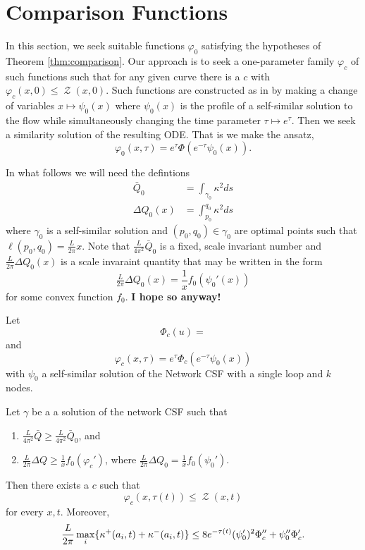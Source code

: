 \documentclass[11pt]{amsart}
\DeclareMathOperator{\chordarcprofile}{\mathcal{Z}}
\begin{document}
\section{Comparison Functions}
\label{sec:orgheadline11}

In this section, we seek suitable functions $\varphi_0$ satisfying the hypotheses of Theorem \ref{thm:comparison}. Our approach is to seek a one-parameter family $\varphi_c$ of such functions such that for any given curve there is a $c$ with $\varphi_c(x, 0) \leq \chordarcprofile(x, 0)$. Such functions are constructed as in \cite{MR2794630} by making a change of variables $x \mapsto \psi_0(x)$ where $\psi_0(x)$ is the profile of a self-similar solution to the flow while simultaneously changing the time parameter $\tau \mapsto e^{\tau}$. Then we seek a similarity solution of the resulting ODE. That is we make the ansatz,
\[
\varphi_0(x, \tau) = e^{\tau} \Phi(e^{-\tau} \psi_0(x)).
\]

In what follows we will need the defintions
\begin{align*}
\bar{Q}_0 &= \int_{\gamma_0} \kappa^2 ds \\
\Delta Q_0 (x) &= \int_{p_0}^{q_0} \kappa^2 ds
\end{align*}
where $\gamma_0$ is a self-similar solution and $(p_0, q_0) \in \gamma_0$ are optimal points such that $\ell(p_0, q_0) = \frac{L}{2\pi} x$. Note that $\tfrac{L}{4\pi^2} \bar{Q}_0$ is a fixed, scale invariant number and $\tfrac{L}{2\pi} \Delta Q_0(x)$ is a scale invaraint quantity that may be written in the form
\[
\tfrac{L}{2\pi} \Delta Q_0 (x) = \frac{1}{x} f_0(\psi_0'(x))
\]
for some convex function $f_0$. \textbf{I hope so anyway!}

\begin{theorem}
\label{thm:comparison_function}
Let
\[
\Phi_c(u) = 
\]
and
\[
\varphi_c(x, \tau) = e^{\tau} \Phi_c(e^{-\tau} \psi_0(x))
\]
with $\psi_0$ a self-similar solution of the Network CSF with a single loop and $k$ nodes.

Let $\gamma$ be a a solution of the network CSF such that
\begin{enumerate}
\item $\frac{L}{4\pi^2} \bar{Q} \geq \frac{L}{4\pi^2} \bar{Q}_0$, and
\item $\frac{L}{2\pi} \Delta Q \geq \tfrac{1}{x} f_0(\varphi_c')$, where $\frac{L}{2\pi} \Delta Q_0 = \tfrac{1}{x} f_0(\psi_0')$.
\end{enumerate}
Then there exists a $c$ such that
\[
\varphi_c(x, \tau(t)) \leq \chordarcprofile(x, t)
\]
for every $x, t$. Moreover,
\[
\frac{L}{2\pi} \max_i \{\operatorname{\kappa}^+(a_i, t) + \operatorname{\kappa}^-(a_i, t)\} \leq 8 e^{-\tau(t)} (\psi_0')^2 \Phi_c'' + \psi_0'' \Phi_c'.
\]
\end{theorem}
\end{document}
